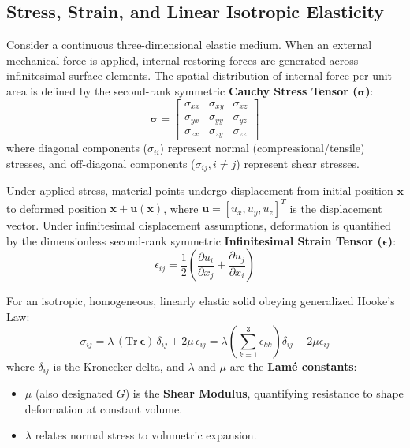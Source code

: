 \documentclass[11pt,a4paper]{article}
\begin{document}
\subsection{Stress, Strain, and Linear Isotropic Elasticity}
Consider a continuous three-dimensional elastic medium. When an external mechanical force is applied, internal restoring forces are generated across infinitesimal surface elements. The spatial distribution of internal force per unit area is defined by the second-rank symmetric \textbf{Cauchy Stress Tensor ($\boldsymbol{\sigma}$)}:
\begin{equation}
    \boldsymbol{\sigma} = 
    \begin{bmatrix}
    \sigma_{xx} & \sigma_{xy} & \sigma_{xz} \\
    \sigma_{yx} & \sigma_{yy} & \sigma_{yz} \\
    \sigma_{zx} & \sigma_{zy} & \sigma_{zz}
    \end{bmatrix}
\end{equation}
where diagonal components ($\sigma_{ii}$) represent normal (compressional/tensile) stresses, and off-diagonal components ($\sigma_{ij}, i \neq j$) represent shear stresses.

Under applied stress, material points undergo displacement from initial position $\mathbf{x}$ to deformed position $\mathbf{x} + \mathbf{u}(\mathbf{x})$, where $\mathbf{u} = [u_x, u_y, u_z]^T$ is the displacement vector. Under infinitesimal displacement assumptions, deformation is quantified by the dimensionless second-rank symmetric \textbf{Infinitesimal Strain Tensor ($\boldsymbol{\epsilon}$)}:
\begin{equation}
    \epsilon_{ij} = \frac{1}{2} \left( \frac{\partial u_i}{\partial x_j} + \frac{\partial u_j}{\partial x_i} \right)
\end{equation}

For an isotropic, homogeneous, linearly elastic solid obeying generalized Hooke's Law:
\begin{equation}
    \sigma_{ij} = \lambda \, (\text{Tr}\,\boldsymbol{\epsilon}) \, \delta_{ij} + 2\mu \, \epsilon_{ij} = \lambda \left( \sum_{k=1}^3 \epsilon_{kk} \right) \delta_{ij} + 2\mu \epsilon_{ij}
\end{equation}
where $\delta_{ij}$ is the Kronecker delta, and $\lambda$ and $\mu$ are the \textbf{Lamé constants}:
\begin{itemize}
    \item $\mu$ (also designated $G$) is the \textbf{Shear Modulus}, quantifying resistance to shape deformation at constant volume.
    \item $\lambda$ relates normal stress to volumetric expansion.
\end{itemize}
\end{document}
